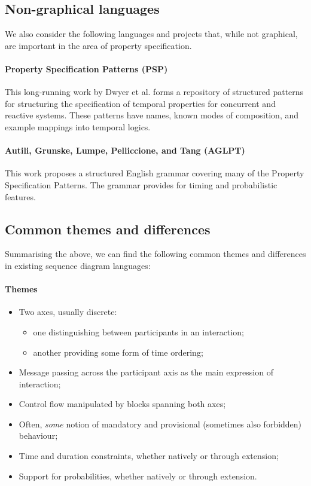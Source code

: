 \subsection{Non-graphical languages}

We also consider the following languages and projects that, while not
graphical, are important in the area of property specification.

\paragraph{Property Specification Patterns (PSP)}

This long-running work by Dwyer et al. forms a repository of
structured patterns for structuring the specification of temporal
properties for concurrent and reactive systems.  These patterns have names,
known modes of composition, and example mappings into temporal logics.

\paragraph{Autili, Grunske, Lumpe, Pelliccione, and Tang (AGLPT)}

This work proposes a structured English grammar covering many of the Property
Specification Patterns.  The grammar provides for timing and probabilistic
features.

\subsection{Common themes and differences}

Summarising the above, we can find the following common
themes and differences in existing sequence
diagram languages:

\paragraph{Themes}

\begin{itemize}
\item
  Two axes, usually discrete:
  \begin{itemize}
  \item
    one distinguishing between participants in an interaction;
  \item
    another providing some form of time ordering;
  \end{itemize}
\item
  Message passing across the participant axis as the main expression of
  interaction;
\item
  Control flow manipulated by blocks 
  spanning both axes;
\item
  Often, \emph{some} notion of mandatory and provisional
  (sometimes also forbidden) behaviour;
\item
  Time and duration constraints, whether natively or through extension;
\item
  Support for probabilities, whether natively or through extension.
\end{itemize}


